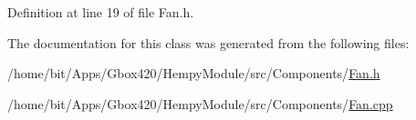 Definition at line 19 of file Fan.\+h.



The documentation for this class was generated from the following files\+:\begin{DoxyCompactItemize}
\item 
/home/bit/\+Apps/\+Gbox420/\+Hempy\+Module/src/\+Components/\hyperlink{_hempy_module_2src_2_components_2_fan_8h}{Fan.\+h}\item 
/home/bit/\+Apps/\+Gbox420/\+Hempy\+Module/src/\+Components/\hyperlink{_hempy_module_2src_2_components_2_fan_8cpp}{Fan.\+cpp}\end{DoxyCompactItemize}
